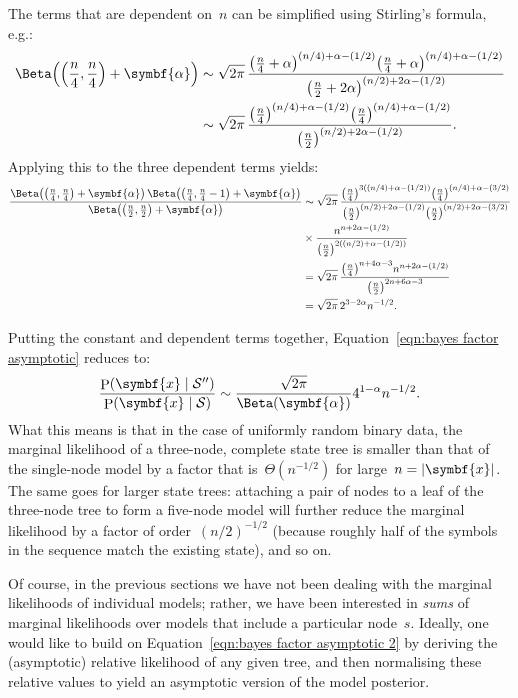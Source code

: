 \documentclass[11pt,a4paper]{article}
\newcommand\mc[1]{\mathcal{#1}}               %
\newcommand\ub[1]{\symbf{#1}}                 %
\DeclareMathOperator\Pb{P}                    %
\DeclarePairedDelimiter\lr{\lparen}{\rparen}  %
\DeclarePairedDelimiter\abs{\lvert}{\rvert}   %
\begin{document}
The terms that are dependent on~\(n\) can be simplified using Stirling's
formula, e.g.:
\begin{align*}
  \Beta\lr*{\lr*{\frac{n}{4}, \frac{n}{4}} + \ub{\alpha}} &\sim
    \sqrt{2\pi}\, \frac{\lr*{\frac{n}{4} + \alpha}^{(n/4)+\alpha-(1/2)}
    \lr*{\frac{n}{4} + \alpha}^{(n/4)+\alpha-(1/2)}}
    {\lr*{\frac{n}{2} + 2\alpha}^{(n/2)+2\alpha-(1/2)}} \\
  &\sim \sqrt{2\pi}\, \frac{\lr*{\frac{n}{4}}^{(n/4)+\alpha-(1/2)}
    \lr*{\frac{n}{4}}^{(n/4)+\alpha-(1/2)}}
    {\lr*{\frac{n}{2}}^{(n/2)+2\alpha-(1/2)}}.
\end{align*}
Applying this to the three dependent terms yields:
\begin{align*}
  \frac{\Beta\lr*{\lr*{\frac{n}{4}, \frac{n}{4}} + \ub{\alpha}}\,
    \Beta\lr*{\lr*{\frac{n}{4}, \frac{n}{4}-1} + \ub{\alpha}}}
    {\Beta\lr*{\lr*{\frac{n}{2}, \frac{n}{2}} + \ub{\alpha}}}
  &\sim \sqrt{2\pi}\, \frac{\lr*{\frac{n}{4}}^{3((n/4)+\alpha-(1/2))}
    \lr*{\frac{n}{4}}^{(n/4)+\alpha-(3/2)}}
    {\lr*{\frac{n}{2}}^{(n/2)+2\alpha-(1/2)}
    \lr*{\frac{n}{2}}^{(n/2)+2\alpha-(3/2)}} \\
  &\times \frac{n^{n+2\alpha-(1/2)}}
    {\lr*{\frac{n}{2}}^{2((n/2)+\alpha-(1/2))}} \\
  &= \sqrt{2\pi}\, \frac{\lr*{\frac{n}{4}}^{n+4\alpha-3} n^{n+2\alpha-(1/2)}}
    {\lr*{\frac{n}{2}}^{2n+6\alpha-3}} \\
  &= \sqrt{2\pi}\, 2^{3-2\alpha} n^{-1/2}.
\end{align*}

Putting the constant and dependent terms together, Equation~\eqref{eqn:bayes
factor asymptotic} reduces to:
\begin{equation}\label{eqn:bayes factor asymptotic 2}
  \frac{\Pb(\ub{x} \mid \mc{S}'')}{\Pb(\ub{x} \mid \mc{S})} \sim
    \frac{\sqrt{2\pi}}{\Beta(\ub{\alpha})} 4^{1-\alpha} n^{-1/2}.
\end{equation}
What this means is that in the case of uniformly random binary data, the
marginal likelihood of a three-node, complete state tree is smaller than that of
the single-node model by a factor that is~\(\Theta(n^{-1/2})\) for large~\(n =
\abs{\ub{x}}\). The same goes for larger state trees: attaching a pair of nodes
to a leaf of the three-node tree to form a five-node model will further reduce
the marginal likelihood by a factor of order~\((n/2)^{-1/2}\) (because roughly
half of the symbols in the sequence match the existing state), and so on.

Of course, in the previous sections we have not been dealing with the marginal
likelihoods of individual models; rather, we have been interested in \emph{sums}
of marginal likelihoods over models that include a particular node~\(s\).
Ideally, one would like to build on Equation~\ref{eqn:bayes factor asymptotic 2}
by deriving the (asymptotic) relative likelihood of any given tree, and then
normalising these relative values to yield an asymptotic version of the model
posterior.
\end{document}
